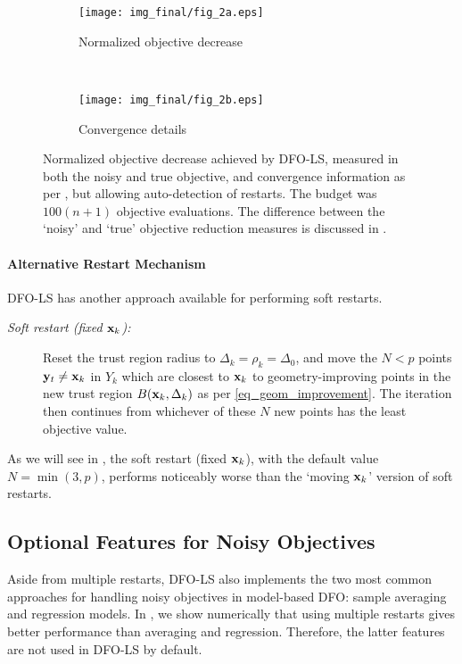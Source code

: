 \begin{figure}
	\centering
	\begin{subfigure}[b]{0.48\textwidth}
		\texttt{[image: img\_final/fig\_2a.eps]}
		\caption{Normalized objective decrease}
		\label{fig_restarts_autodetect_motivation_obj_redn}
	\end{subfigure}
	~
	\begin{subfigure}[b]{0.48\textwidth}
		\texttt{[image: img\_final/fig\_2b.eps]}
		\caption{Convergence details}
	\end{subfigure}
	\caption{Normalized objective decrease achieved by DFO-LS, measured in both the noisy and true objective, and convergence information as per , but allowing auto-detection of restarts. The budget was $100(n+1)$ objective evaluations. The difference between the `noisy' and `true' objective reduction measures is discussed in .}
	\label{fig_restarts_autodetect_motivation}
\end{figure}

\paragraph{Alternative Restart Mechanism}
DFO-LS has another approach available for performing soft restarts.
\begin{description}
	\item[\normalfont\textit{Soft restart (fixed $\mathbf{x}_k$):}] Reset the trust region radius to $\Delta_k=\rho_k=\Delta_0$, and move the $N<p$ points $\mathbf{y}_t\neq\mathbf{x}_k$ in $Y_k$ which are closest to $\mathbf{x}_k$ to geometry-improving points in the new trust region $B(\mathbf{x}_k,\Delta_k)$ as per \eqref{eq_geom_improvement}.  
	The iteration then continues from whichever of these $N$ new points has the least objective value.
\end{description}
As we will see in , the soft restart (fixed $\mathbf{x}_k$), with the default value $N=\min(3,p)$, performs noticeably worse than the `moving $\mathbf{x}_k$' version of soft restarts.

\subsection{Optional Features for Noisy Objectives} \label{sec_other_noisy_features}
Aside from multiple restarts, DFO-LS also implements the two most common approaches for handling noisy objectives in model-based DFO: sample averaging and regression models.
In , we show numerically that using multiple restarts gives better performance than averaging and regression. Therefore, the latter features are not used in DFO-LS by default.

